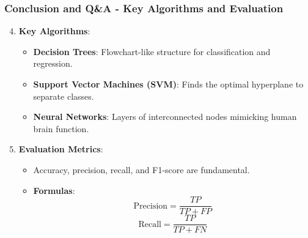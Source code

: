 \documentclass[aspectratio=169]{beamer}
\begin{document}
\begin{frame}[fragile]
    \frametitle{Conclusion and Q\&A - Key Algorithms and Evaluation}
    \begin{enumerate}\setcounter{enumi}{3}
        \item \textbf{Key Algorithms}:
          \begin{itemize}
              \item \textbf{Decision Trees}: Flowchart-like structure for classification and regression.
              \item \textbf{Support Vector Machines (SVM)}: Finds the optimal hyperplane to separate classes.
              \item \textbf{Neural Networks}: Layers of interconnected nodes mimicking human brain function.
          \end{itemize}
        \item \textbf{Evaluation Metrics}:
          \begin{itemize}
              \item Accuracy, precision, recall, and F1-score are fundamental.
              \item \textbf{Formulas}:
              \begin{equation}
                  \text{Precision} = \frac{TP}{TP + FP}
              \end{equation}
              \begin{equation}
                  \text{Recall} = \frac{TP}{TP + FN}
              \end{equation}
          \end{itemize}
    \end{enumerate}
\end{frame}
\end{document}
